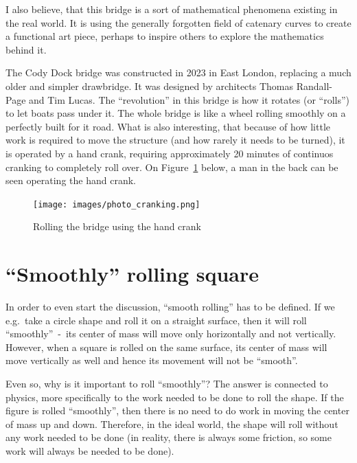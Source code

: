 \documentclass[12pt]{article}
\begin{document}
        I also believe, that this bridge is a sort of mathematical phenomena existing in the real world. It is using the generally forgotten field of catenary curves to create a functional art piece, perhaps to inspire others to explore the mathematics behind it.

        The Cody Dock bridge was constructed in 2023 in East London, replacing a much older and simpler drawbridge. It was designed by architects Thomas Randall-Page and Tim Lucas. The ``revolution'' in this bridge is how it rotates (or ``rolls'') to let boats pass under it. The whole bridge is like a wheel rolling smoothly on a perfectly built for it road. What is also interesting, that because of how little work is required to move the structure (and how rarely it needs to be turned), it is operated by a hand crank, requiring approximately 20 minutes of continuos cranking to completely roll over.\cite{bridge_newatlas} On Figure~\ref{fig:photo_cranking} below, a man in the back can be seen operating the hand crank.

        \begin{figure}[H]
            \centering
            \texttt{[image: images/photo\_cranking.png]}
            \caption[Rolling the bridge using the hand crank]{Rolling the bridge using the hand crank\footnotemark}\label{fig:photo_cranking}
        \end{figure}


    \section{``Smoothly'' rolling square}

        In order to even start the discussion, ``smooth rolling'' has to be defined. If we e.g.\ take a circle shape and roll it on a straight surface, then it will roll ``smoothly''~-~its center of mass will move only horizontally and not vertically. However, when a square is rolled on the same surface, its center of mass will move vertically as well and hence its movement will not be ``smooth''.

        Even so, why is it important to roll ``smoothly''? The answer is connected to physics, more specifically to the work needed to be done to roll the shape. If the figure is rolled ``smoothly'', then there is no need to do work in moving the center of mass up and down. Therefore, in the ideal world, the shape will roll without any work needed to be done (in reality, there is always some friction, so some work will always be needed to be done).
\end{document}

